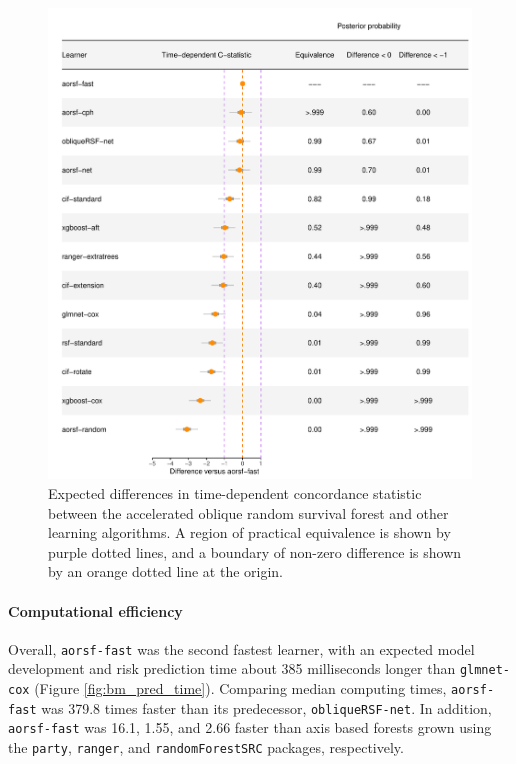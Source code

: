 \documentclass{article}\usepackage[]{graphicx}\usepackage[]{xcolor}
\makeatletter
\def\maxwidth{ %
  \ifdim\Gin@nat@width>\linewidth
    \linewidth
  \else
    \Gin@nat@width
  \fi
}
\newenvironment{knitrout}{}{} %
\makeatother
\begin{document}
\begin{knitrout}
\color{fgcolor}\begin{figure}
\includegraphics[width=\maxwidth]{figure/bm_pred_model_viz_cstat-1} \caption[Expected differences in time-dependent concordance statistic between the accelerated oblique random survival forest and other learning algorithms]{Expected differences in time-dependent concordance statistic between the accelerated oblique random survival forest and other learning algorithms. A region of practical equivalence is shown by purple dotted lines, and a boundary of non-zero difference is shown by an orange dotted line at the origin.}\label{fig:bm_pred_model_viz_cstat}
\end{figure}

\end{knitrout}




\paragraph{Computational efficiency}

Overall, \texttt{aorsf-fast} was the second fastest learner, with an expected model development and risk prediction time about 385 milliseconds longer than \texttt{glmnet-cox} (Figure \ref{fig:bm_pred_time}). Comparing median computing times, \texttt{aorsf-fast} was 379.8 times faster than its predecessor, \texttt{obliqueRSF-net}. In addition, \texttt{aorsf-fast} was 16.1, 1.55, and 2.66 faster than axis based forests grown using the \texttt{party}, \texttt{ranger}, and \texttt{randomForestSRC} packages, respectively.
\end{document}
